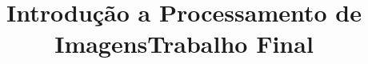 \documentclass[journal]{IEEEtran}
\begin{document}
%
\title{Introdução a Processamento de Imagens\newline Trabalho Final}
%
%
%

\author{
 \\
\and
{}
}%


% 
%
\end{document}
